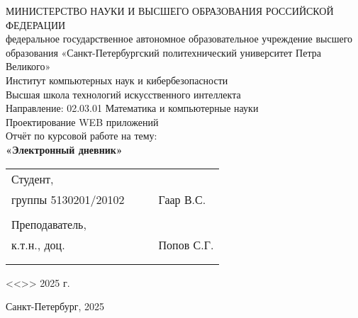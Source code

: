 \documentclass[a4paper, final]{article}
\begin{document}
\begin{center}
\hfill \break
\hfill \break
\normalsize{МИНИСТЕРСТВО НАУКИ И ВЫСШЕГО ОБРАЗОВАНИЯ РОССИЙСКОЙ ФЕДЕРАЦИИ\\
 федеральное государственное автономное образовательное учреждение высшего образования «Санкт-Петербургский политехнический университет Петра Великого»\\[10pt]}
\normalsize{Институт компьютерных наук и кибербезопасности}\\[10pt] 
\normalsize{Высшая школа технологий искусственного интеллекта}\\[10pt] 
\normalsize{Направление: 02.03.01 Математика и компьютерные науки}\\

\hfill \break
\hfill \break
\hfill \break
\large{Проектирование WEB приложений}\\
\large{Отчёт по курсовой работе на тему:}\\
\large{\textbf{«Электронный дневник»\\}}

\hfill \break
\hfill \break
\end{center}
 
\small{ 
\begin{tabular}{lrrl}
\!\!\!Студент, & \hspace{2cm} & & \\
\!\!\!группы 5130201/20102 & \hspace{2cm} & \underline{\hspace{3cm}} & Гаар В.С. \\\\
\!\!\!Преподаватель, \hspace{2cm} & & \\
\!\!\!к.т.н., доц. & \hspace{2cm} & \underline{\hspace{3cm}} &  Попов С.Г. \\\\
&&\hspace{5cm}
\end{tabular}
\begin{flushright}
<<\underline{\hspace{1cm}}>>\underline{\hspace{2.5cm}} 2025 г.
\end{flushright}
}

\hfill \break
\hfill \break
\begin{center} \small{Санкт-Петербург, 2025} \end{center}
\thispagestyle{empty} %
\end{document}

